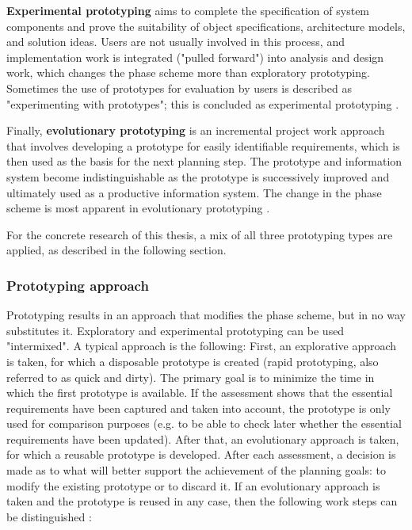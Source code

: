 \textbf{Experimental prototyping} aims to complete the specification of system components and
prove the suitability of object specifications, architecture models, and solution ideas.
Users are not usually involved in this process, and implementation work is integrated ("pulled forward") into analysis and design work,
which changes the phase scheme more than exploratory prototyping.
Sometimes the use of prototypes for evaluation by users is described as "experimenting with prototypes";
this is concluded as experimental prototyping
\autocite{riedlManagementInformatik2019}.

Finally, \textbf{evolutionary prototyping} is an incremental project work approach that involves developing 
a prototype for easily identifiable requirements, which is then used as the basis for the next planning step. 
The prototype and information system become indistinguishable as the prototype is successively improved 
and ultimately used as a productive information system. 
The change in the phase scheme is most apparent in evolutionary prototyping
\autocite{riedlManagementInformatik2019}.

For the concrete research of this thesis,
a mix of all three prototyping types are applied,
as described in the following section.

\subsubsection*{Prototyping approach}

Prototyping results in an approach that modifies the phase scheme, but in no way substitutes it. Exploratory and experimental prototyping can be used "intermixed". A typical approach is the following: First, an explorative approach is taken, for which a disposable prototype is created (rapid prototyping, also referred to as quick and dirty). The primary goal is to minimize the time in which the first prototype is available. If the assessment shows that the essential requirements have been captured and taken into account, the prototype is only used for comparison purposes (e.g. to be able to check later whether the essential requirements have been updated). After that, an evolutionary approach is taken, for which a reusable prototype is developed. After each assessment, a decision is made as to what will better support the achievement of the planning goals: to modify the existing prototype or to discard it. If an evolutionary approach is taken and the prototype is reused in any case, then the following work steps can be distinguished
\autocite{riedlManagementInformatik2019}:


